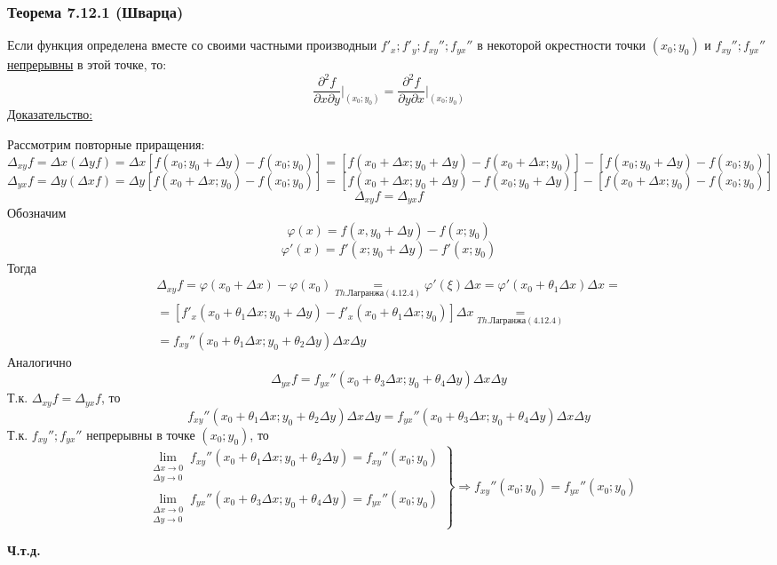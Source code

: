 \documentclass[12pt]{article}
\begin{document}
    \subsubsection*{Теорема 7.12.1 (Шварца)}\label{th:7.12.1}
    Если функция определена вместе со своими частными производныи $f'_x; f'_y; f_{xy}''; f_{yx}''$ в некоторой окрестности точки $(x_0; y_0)$ и \underline{$f_{xy}''; f_{yx}''$ непрерывны} в этой точке, то:
    \[ \frac{\partial^2 f}{\partial x \partial y} \Big|_{(x_0; y_0)} = \frac{\partial^2 f}{\partial y \partial x} \Big|_{(x_0; y_0)} \]
    \underline{Доказательство:}
    \begin{adjustwidth}{1.5em}{1.5em}
        Рассмотрим повторные приращения:
        \[ \Delta_{xy} f = \Delta x (\Delta y f) = \Delta x [ f(x_0; y_0 + \Delta y) - f(x_0; y_0) ] = [ f(x_0 + \Delta x; y_0 + \Delta y) - f(x_0 + \Delta x; y_0) ] - [ f(x_0; y_0 + \Delta y) - f(x_0; y_0) ] \]
        \[ \Delta_{yx} f = \Delta y (\Delta x f) = \Delta y [ f(x_0 + \Delta x; y_0) - f(x_0; y_0) ] = [ f(x_0 + \Delta x; y_0 + \Delta y) - f(x_0; y_0 + \Delta y) ] - [ f(x_0 + \Delta x; y_0) - f(x_0; y_0) ] \]
        \[ \Delta_{xy}f = \Delta_{yx}f \]
        Обозначим
        \[ \varphi(x) = f(x, y_0 + \Delta y) - f(x; y_0) \]
        \[ \varphi'(x) = f'(x; y_0 + \Delta y) - f'(x;y_0) \]
        Тогда
        \begin{gather*}
            \Delta_{xy}f = \varphi (x_0 + \Delta x) - \varphi(x_0) \underset{Th. Лагранжа (4.12.4)}{=} \varphi'(\xi)\Delta x = \varphi'(x_0 + \theta_1 \Delta x)\Delta x =\\
            = [ f'_x(x_0 + \theta_1 \Delta x; y_0 + \Delta y) - f'_x(x_0 + \theta_1 \Delta x; y_0) ] \Delta x \underset{Th. Лагранжа (4.12.4)}{=}\\
            = f_{xy}''(x_0 + \theta_1 \Delta x; y_0 + \theta_2 \Delta y)\Delta x \Delta y
        \end{gather*}
        Аналогично 
        \[ \Delta_{yx}f = f_{yx}''(x_0 + \theta_3 \Delta x; y_0 + \theta_4 \Delta y)\Delta x \Delta y \]
        Т.к. $\Delta_{xy}f = \Delta_{yx}f$, то
        \[ f_{xy}''(x_0 + \theta_1 \Delta x; y_0 + \theta_2 \Delta y)\Delta x \Delta y = f_{yx}''(x_0 + \theta_3 \Delta x; y_0 + \theta_4 \Delta y)\Delta x \Delta y \]
        Т.к. $f_{xy}''; f_{yx}''$ непрерывны в точке $(x_0; y_0)$, то
        \[ \left.\begin{aligned}
            \lim_{\substack{\Delta x \to 0 \\ \Delta y \to 0}} f_{xy}'' (x_0 + \theta_1 \Delta x; y_0 + \theta_2 \Delta y) = f_{xy}'' (x_0; y_0)\\
            \lim_{\substack{\Delta x \to 0 \\ \Delta y \to 0}} f_{yx}'' (x_0 + \theta_3 \Delta x; y_0 + \theta_4 \Delta y) = f_{yx}'' (x_0; y_0)
        \end{aligned}\right\rbrace \Rightarrow f_{xy}'' (x_0; y_0) = f_{yx}''(x_0; y_0) \]
        \begin{center}
            \textbf{Ч.т.д.}
        \end{center}
    \end{adjustwidth}
\end{document}
